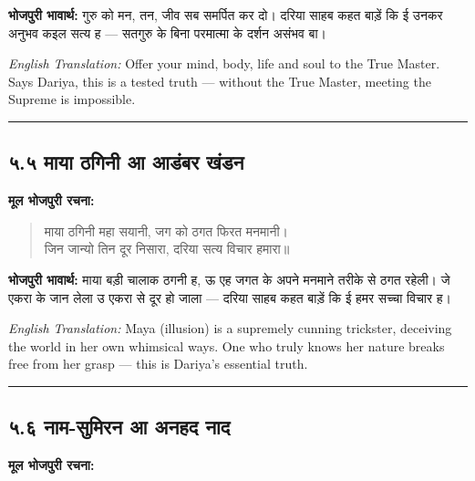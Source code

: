 \textbf{भोजपुरी भावार्थ:} गुरु को मन, तन, जीव सब समर्पित कर दो। दरिया साहब कहत बाड़ें कि ई उनकर अनुभव कइल सत्य ह --- सतगुरु के बिना परमात्मा के दर्शन असंभव बा।

\begin{sloppypar}
{\engfont \textit{English Translation:} Offer your mind, body, life and soul to the True Master.
Says Dariya, this is a tested truth --- without the True Master, meeting the Supreme is impossible.}
\end{sloppypar}

\begin{center}
{\color{bordercolor}\rule{0.4\textwidth}{0.4pt}}
\end{center}

\subsection*{५.५ माया ठगिनी आ आडंबर खंडन}

\textbf{मूल भोजपुरी रचना:}

\begin{quote}
माया ठगिनी महा सयानी, जग को ठगत फिरत मनमानी।\\
जिन जान्यो तिन दूर निसारा, दरिया सत्य विचार हमारा॥
\end{quote}

\textbf{भोजपुरी भावार्थ:} माया बड़ी चालाक ठगनी ह, ऊ एह जगत के अपने मनमाने तरीके से ठगत रहेली। जे एकरा के जान लेला उ एकरा से दूर हो जाला — दरिया साहब कहत बाड़ें कि ई हमर सच्चा विचार ह।

\begin{sloppypar}
{\engfont \textit{English Translation:} Maya (illusion) is a supremely cunning trickster, deceiving the world in her own whimsical ways.
One who truly knows her nature breaks free from her grasp --- this is Dariya's essential truth.}
\end{sloppypar}

\begin{center}
{\color{bordercolor}\rule{0.4\textwidth}{0.4pt}}
\end{center}

\subsection*{५.६ नाम-सुमिरन आ अनहद नाद}

\textbf{मूल भोजपुरी रचना:}


